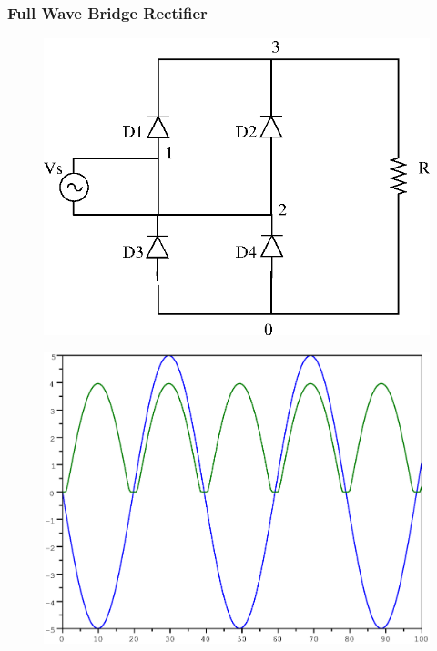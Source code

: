\documentclass{beamer}
\begin{document}
\begin{frame}
\frametitle{Full Wave Bridge Rectifier}
\begin{minipage}[!b]{0.4\linewidth} %
\begin{figure}[h]
\centering
\includegraphics[scale=0.5]{../figures/bridge.eps}
\end{figure}
\end{minipage}
\hspace{0.5cm} %
\begin{minipage}[!b]{0.5\linewidth} %
\begin{figure}[h]
\centering
\includegraphics[scale=0.3]{../figures/bridgeOutput.eps}
\end{figure}
\end{minipage}
\end{frame}
\end{document}
